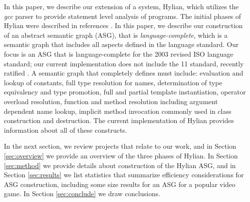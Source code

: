 In this paper, we describe our extension of a system, Hylian,
which utilizes the {\em gcc} parser to provide statement level
analysis of {\CPP} programs. The initial phases of Hylian were 
described in references 
\cite{duffy05-sera,duffy-wcre07,Duffy-Malloy:2007,Duffy-etal:2008,IJSEKE}.
In this paper, we describe our construction of an abstract semantic 
graph (ASG), that is {\em language-complete}, which is a semantic graph
that includes all aspects defined in the language standard.
Our focus is an ASG that is language-complete
for the 2003 revised ISO {\CPP} language standard; our current
implementation does not include the {\CPP}11 standard, recently
ratified \cite{isocpp-11}.
A semantic graph that completely defines {\CPP} must include:
evaluation and lookup
of constants, full type resolution for names, determination of
type equivalency and type promotion, full and partial template
instantiation, operator overload resolution, function and method
resolution including argument dependent name lookup, implicit
method invocation commonly used in class construction and destruction.
The current implementation of Hylian provides information about
all of these constructs.

In the next section, we review projects that relate to
our work, and in Section \ref{sec:overview} we provide an overview 
of the three phases of Hylian. In Section \ref{sec:method} we 
provide details about construction of the Hylian ASG, and
in Section \ref{sec:results} we list statistics that 
summarize efficiency considerations for ASG construction, including 
some size results for an ASG for a popular video game. 
In Section \ref{sec:conclude} we draw conclusions.


